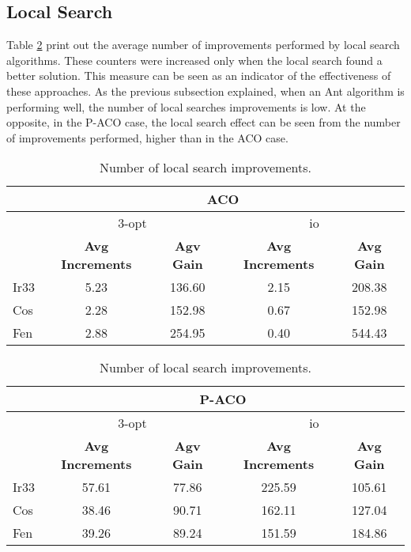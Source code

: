 \documentclass[a4paper,9pt,journal,twoside,compsoc]{PPIEEEtran}
\begin{document}
\subsection{Local Search}
Table \ref{tab:numls} print out the average number of improvements performed by local search algorithms. These counters were increased only when the local search found a better solution. This measure can be seen as an indicator of the effectiveness of these approaches.
As the previous subsection explained, when an Ant algorithm is performing well, the number of local searches improvements is low. At the opposite, in the P-ACO case, the local search effect can be seen from the number of improvements performed, higher than in the ACO case.

\begin{table}[h]
\caption{Number of local search improvements.}
\scriptsize
\centering
\begin{tabular}{|l|c|c|c|c|}
\hline
     & \multicolumn{4}{c|}{ACO} \\ \hline
     &  \multicolumn{2}{c|}{3-opt} & \multicolumn{2}{c|}{io} \\ \hline
     & \textbf{Avg Increments} & \textbf{Agv Gain} & \textbf{Avg Increments} & \textbf{Avg Gain} \\ \hline  
Ir33 & 5.23   & 136.60 & 2.15 & 208.38   \\ \hline
Cos  & 2.28   & 152.98 & 0.67 & 152.98   \\ \hline
Fen  & 2.88   & 254.95 & 0.40 & 544.43   \\ \hline

\end{tabular}

\begin{tabular}{|l|c|c|c|c|}
\hline
     & \multicolumn{4}{c|}{P-ACO} \\ \hline
     & \multicolumn{2}{c|}{3-opt} & \multicolumn{2}{c|}{io} \\ \hline
     & \textbf{Avg Increments} & \textbf{Agv Gain} & \textbf{Avg Increments} & \textbf{Avg Gain} \\ \hline  
Ir33 & 57.61  & 77.86  & 225.59 & 105.61  \\ \hline
Cos  & 38.46  & 90.71  & 162.11 & 127.04 \\ \hline
Fen  & 39.26  & 89.24  & 151.59 & 184.86 \\ \hline
\end{tabular}
\label{tab:numls}
\end{table}
\end{document}
